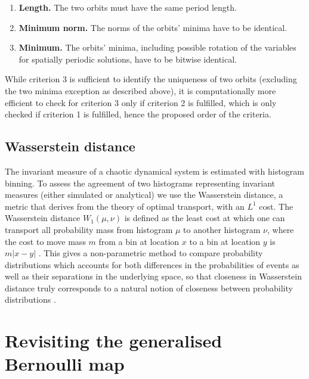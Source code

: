 \begin{enumerate}
\item \textbf{Length.} The two orbits must have the same period length.
\item \textbf{Minimum norm.} The norms of the orbits’ minima have to be identical.
\item \textbf{Minimum.} The orbits’ minima, including possible rotation of the variables for spatially periodic solutions, have to be bitwise identical.
\end{enumerate}

While criterion 3 is sufficient to identify the uniqueness of two orbits (excluding the two minima exception as described above),
it is computationally more efficient to check for criterion 3 only if criterion 2 is fulfilled, which is only checked if criterion 1 is fulfilled,
hence the proposed order of the criteria.
\subsection{Wasserstein distance}
\label{sec:wasserstein}

The invariant measure of a chaotic dynamical system is estimated with histogram binning. To assess the agreement
of two histograms representing invariant measures (either simulated or analytical) we use the Wasserstein distance,
a metric that derives from the theory of optimal transport, with an $L^1$ cost. The Wasserstein distance $W_1(\mu,\nu)$
is defined as the least cost at which one can transport all probability mass from histogram $\mu$ to another histogram $\nu$,
where the cost to move mass $m$ from a bin at location $x$ to a bin at location $y$ is $m \vert x-y \vert$ \citep{Paxton2021,Villani2003}.
This gives a non-parametric method to compare probability distributions which accounts for both differences in the probabilities
of events as well as their separations in the underlying space, so that closeness in Wasserstein distance truly corresponds
to a natural notion of closeness between probability distributions \citep[Thm 7.12]{Villani2003}.

\section{Revisiting the generalised Bernoulli map}
\label{sec:revisit_bernoulli}

